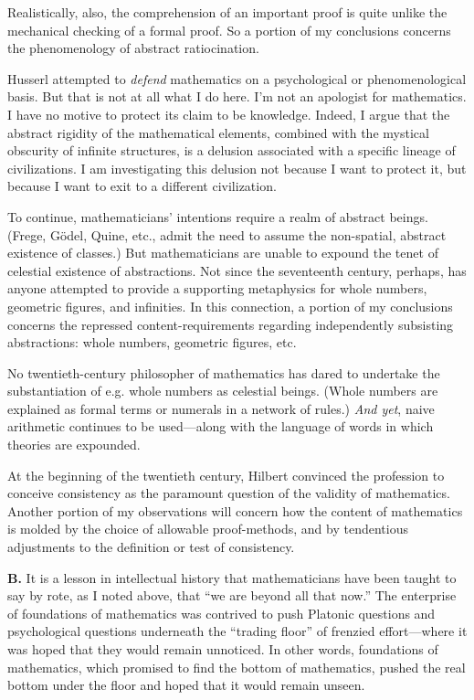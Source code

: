 Realistically, also, the comprehension of an important proof is quite unlike the mechanical checking of a formal proof. So a portion of my conclusions concerns the phenomenology of abstract ratiocination.

Husserl attempted to \emph{defend} mathematics on a psychological or phenomenological basis. But that is not at all what I do here. I'm not an apologist for mathematics. I have no motive to protect its claim to be knowledge. Indeed, I argue that the abstract rigidity of the mathematical elements, combined with the mystical obscurity of infinite structures, is a delusion associated with a specific lineage of civilizations. I am investigating this delusion not because I want to protect it, but because I want to exit to a different civilization.

To continue, mathematicians' intentions require a realm of abstract beings. (Frege, G\"{o}del, Quine, etc., admit the need to assume the non-spatial, abstract existence of classes.) But mathematicians are unable to expound the tenet of celestial existence of abstractions. Not since the seventeenth century, perhaps, has anyone attempted to provide a supporting metaphysics for whole numbers, geometric figures, and infinities. In this connection, a portion of my conclusions concerns the repressed content-requirements regarding independently subsisting abstractions: whole numbers, geometric figures, etc.

No twentieth-century philosopher of mathematics has dared to undertake the substantiation of e.g. whole numbers as celestial beings. (Whole numbers are explained as formal terms or numerals in a network of rules.) \emph{And yet}, naive arithmetic continues to be used---along with the language of words in which theories are expounded.

At the beginning of the twentieth century, Hilbert convinced the profession to conceive consistency as the paramount question of the validity of mathematics. Another portion of my observations will concern how the content of mathematics is molded by the choice of allowable proof-methods, and by tendentious adjustments to the definition or test of consistency.

\jarule

\textbf{B.} It is a lesson in intellectual history that mathematicians have been taught to say by rote, as I noted above, that \enquote{we are beyond all that now.} The enterprise of foundations of mathematics was contrived to push Platonic questions and psychological questions underneath the \enquote{trading floor} of frenzied effort---where it was hoped that they would remain unnoticed. In other words, foundations of mathematics, which promised to find the bottom of mathematics, pushed the real bottom under the floor and hoped that it would remain unseen.


